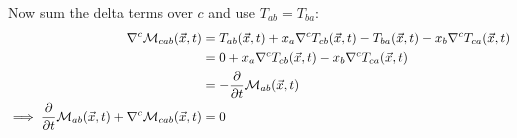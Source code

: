 Now sum the delta terms over $c$ and use $T_{ab}=T_{ba}$:
\begin{align*}
    \nabla^c \mathcal{M}_{cab}(\vec{x}, t) 
    &= T_{ab}(\vec{x}, t) + x_a \nabla^c T_{cb}(\vec{x}, t) - T_{ba}(\vec{x}, t) - x_b \nabla^c T_{ca}(\vec{x}, t) \\
    &= 0 + x_a \nabla^c T_{cb}(\vec{x}, t) - x_b \nabla^c T_{ca}(\vec{x}, t) \\
    &= - \frac{\partial}{\partial t}\mathcal{M}_{ab}(\vec{x}, t) \\
    \implies \frac{\partial}{\partial t}\mathcal{M}_{ab}(\vec{x}, t) + \nabla^c \mathcal{M}_{cab}(\vec{x}, t) 
    &= 0 \\
\end{align*}

